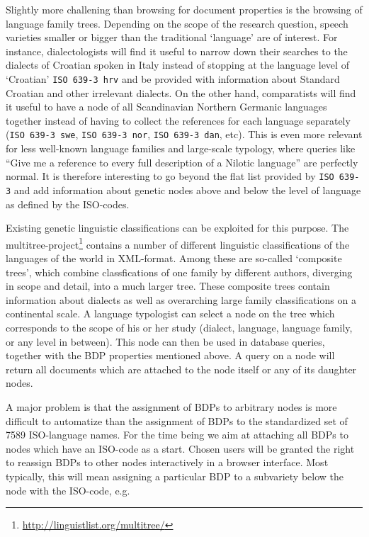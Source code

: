 \documentclass[english,11pt,twoside]{article}
\begin{document}
Slightly more challening than browsing for document properties is the browsing of language family  trees. Depending on the scope of the research question, speech varieties smaller or bigger than the traditional `language' are of interest. For instance, dialectologists will find it useful to narrow down their searches to the dialects of Croatian spoken in Italy instead of stopping at the language level of `Croatian' \texttt{ISO 639-3 hrv} and be provided with information about Standard Croatian and other irrelevant dialects. On the other hand, comparatists will find it useful to have a node of all Scandinavian Northern Germanic languages together instead of having to collect the references for each language separately (\texttt{ISO 639-3 swe}, \texttt{ISO 639-3 nor}, \texttt{ISO 639-3 dan}, etc). This is even more relevant for less well-known language families and large-scale typology, where queries like ``Give me a reference to every full description of a Nilotic language'' are perfectly normal. It is therefore interesting to go beyond the flat list provided by \texttt{ISO 639-3} and add information about genetic nodes above and below the level of language as defined by the ISO-codes.

Existing genetic linguistic classifications can be exploited for this purpose. The multitree-project\footnote{\url{http://linguistlist.org/multitree/}} contains a number of different linguistic classifications of the languages of the world in XML-format. Among these are  so-called `composite trees', which combine   classfications of one family by different authors, diverging in scope and detail, into a much larger tree. These composite trees contain information about  dialects as well as overarching large family classifications on a continental scale. A language typologist can select a node on the tree which corresponds to the scope of his or her study (dialect, language, language family, or any level in between). This node can then be used in database queries, together with the BDP properties mentioned above. A query on a node will return all documents which are attached to the node itself or any of its daughter nodes.

A major problem is that the assignment of BDPs to arbitrary nodes is more difficult to automatize than the assignment of BDPs to the standardized set of 7589 ISO-language names. For the time being we aim at attaching all BDPs to nodes which have an ISO-code as a start. Chosen users will be granted the right to reassign BDPs to other nodes interactively in a browser interface. Most typically, this will mean assigning a particular BDP to a subvariety below the node with the ISO-code, e.g.
\end{document}
